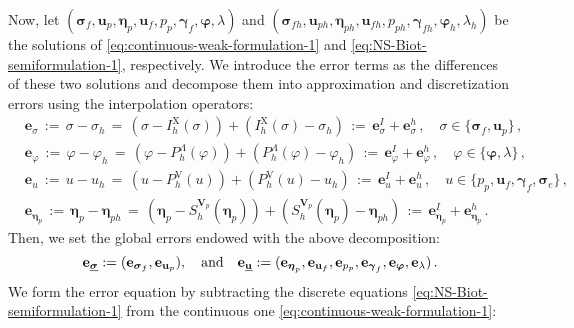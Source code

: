 \documentclass[11pt]{article}
\numberwithin{equation}{section}
\newcommand{\bgamma}{{\boldsymbol\gamma}}
\newcommand{\bbeta}{{\boldsymbol\eta}}
\newcommand{\bsi}{{\boldsymbol\sigma}}
\newcommand{\bvarphi}{{\boldsymbol\varphi}}
\newcommand{\ubsi}{\underline{\bsi}}
\newcommand{\ubu}{\underline{\bu}}
\newcommand{\bu}{\mathbf{u}}
\newcommand{\be}{{\mathbf{e}}}
\newcommand{\0}{{\mathbf{0}}}
\def\bV{\mathbf{V}}
\def\V{\mathrm{V}}
\def\X{\mathrm{X}}
\def\qan{{\quad\hbox{and}\quad}}
\numberwithin{equation}{section}
\begin{document}
Now, let $(\bsi_f,\bu_p, \bbeta_p, \bu_f, p_p, \bgamma_f, \bvarphi, \lambda)$ and $(\bsi_{fh},\bu_{ph}, \bbeta_{ph}, \bu_{fh}, p_{ph}, \bgamma_{fh}, \bvarphi_{h}, \lambda_{h})$ be the solutions of \eqref{eq:continuous-weak-formulation-1} and \eqref{eq:NS-Biot-semiformulation-1}, respectively.   We
introduce the error terms as the differences of these two solutions and
decompose them into approximation and discretization errors
using the interpolation operators:
\begin{align}
& \be_{\sigma} \,:=\, \sigma - \sigma_{h} \,=\,
(\sigma - I^{\X}_h(\sigma)) + (I^{\X}_h(\sigma) - \sigma_{h})
\,:=\, \be^I_{\sigma} + \be^h_{\sigma}\,,
\quad \sigma\in \big\{ \bsi_f, \bu_p \big\}\,, \nonumber \\
& \be_{\varphi} \,:=\, \varphi - \varphi_h
\,=\, (\varphi - P^{\Lambda}_h(\varphi)) + (P^{\Lambda}_h(\varphi) - \varphi_h)
\,:=\, \be^I_{\varphi} + \be^h_{\varphi}\,,
\quad \varphi\in \big\{ \bvarphi, \lambda \big\}\,,\nonumber \\
&\be_{u} \,:=\, u - u_{h} \,=\, (u - P^{\V}_h(u)) + (P^{\V}_h(u) - u_{h})
\,:=\, \be^I_{u} + \be^h_{u}\,, \quad
u\in \big\{ p_p, \bu_f, \bgamma_f, \bsi_e \big\}\,,\nonumber \\
& \be_{\bbeta_p} \,:=\, \bbeta_p - \bbeta_{ph} \,=\, (\bbeta_p - S^{\bV_p}_h(\bbeta_p)) + (S^{\bV_p}_h(\bbeta_p) - \bbeta_{ph})
\,:=\, \be^I_{\bbeta_p} + \be^h_{\bbeta_p} \,.
\label{eq:error-decomposition}
\end{align}
Then, we set the global errors endowed with the above decomposition:
%
\begin{equation*}
\be_{\ubsi} := (\be_{\bsi_f}, \be_{\bu_p}),\qan
\be_{\ubu} := (\be_{\bbeta_p}, \be_{\bu_f}, \be_{p_p}, \be_{\bgamma_f}, \be_{\bvarphi},  \be_{\lambda})\,.
\end{equation*}
%
We form the error equation by subtracting the discrete equations \eqref{eq:NS-Biot-semiformulation-1} from the continuous one  \eqref{eq:continuous-weak-formulation-1}:
\end{document}
